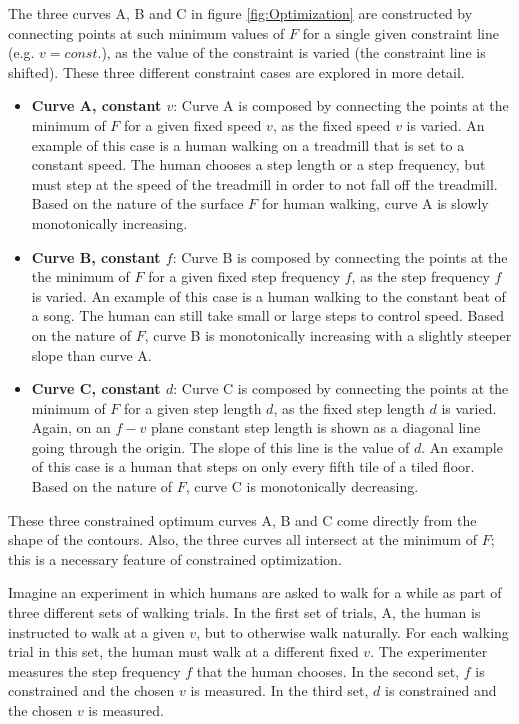 The three curves A, B and C in figure \ref{fig:Optimization} are constructed by connecting points at such minimum values of $F$ for a single given constraint line (e.g. $v = const.$), as the value of the constraint is varied (the constraint line is shifted). These three different constraint cases are explored in more detail.

\begin{itemize}
\item \textbf{Curve A, constant $v$}: Curve A is composed by connecting the points at the minimum of $F$ for a given fixed speed $v$, as the fixed speed $v$ is varied. An example of this case is a human walking on a treadmill that is set to a constant speed. The human chooses a step length or a step frequency, but must step at the speed of the treadmill in order to not fall off the treadmill. Based on the nature of the surface $F$ for human walking, curve A is slowly monotonically increasing.
\item \textbf{Curve B, constant $f$}: Curve B is composed by connecting the points at the the minimum of $F$ for a given fixed step frequency $f$, as the step frequency $f$ is varied. An example of this case is a human walking to the constant beat of a song. The human can still take small or large steps to control speed.  Based on the nature of $F$, curve B is monotonically increasing with a slightly steeper slope than curve A.
\item \textbf{Curve C, constant $d$}: Curve C is composed by connecting the points at the minimum of $F$ for a given step length $d$, as the fixed step length $d$ is varied. Again, on an $f-v$ plane constant step length is shown as a diagonal line going through the origin. The slope of this line is the value of $d$. An example of this case is a human that steps on only every fifth tile of a tiled floor. Based on the nature of $F$, curve C is monotonically decreasing.
\end{itemize}

These three constrained optimum curves A, B and C come directly from the shape of the contours. Also, the three curves all intersect at the minimum of $F$; this is a necessary feature of constrained optimization.

Imagine an experiment in which humans are asked to walk for a while as part of three different sets of walking trials. In the first set of trials, A, the human is instructed to walk at a given $v$, but to otherwise walk naturally. For each walking trial in this set, the human must walk at a different fixed $v$. The experimenter measures the step frequency $f$ that the human chooses. In the second set, $f$ is constrained and the chosen $v$ is measured. In the third set, $d$ is constrained and the chosen $v$ is measured. 

